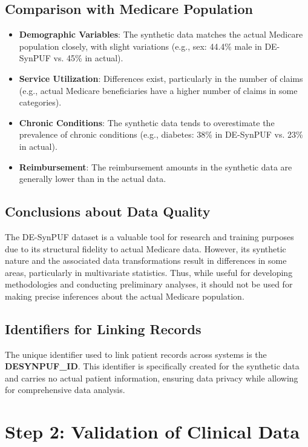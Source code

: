 \documentclass{article}
\begin{document}
\subsection*{Comparison with Medicare Population}

\begin{itemize}
    \item \textbf{Demographic Variables}: The synthetic data matches the actual Medicare population closely, with slight variations (e.g., sex: 44.4\% male in DE-SynPUF vs. 45\% in actual).
    \item \textbf{Service Utilization}: Differences exist, particularly in the number of claims (e.g., actual Medicare beneficiaries have a higher number of claims in some categories).
    \item \textbf{Chronic Conditions}: The synthetic data tends to overestimate the prevalence of chronic conditions (e.g., diabetes: 38\% in DE-SynPUF vs. 23\% in actual).
    \item \textbf{Reimbursement}: The reimbursement amounts in the synthetic data are generally lower than in the actual data.
\end{itemize}

\subsection*{Conclusions about Data Quality}

The DE-SynPUF dataset is a valuable tool for research and training purposes due to its structural fidelity to actual Medicare data. However, its synthetic nature and the associated data transformations result in differences in some areas, particularly in multivariate statistics. Thus, while useful for developing methodologies and conducting preliminary analyses, it should not be used for making precise inferences about the actual Medicare population.

\subsection*{Identifiers for Linking Records}

The unique identifier used to link patient records across systems is the \textbf{DESYNPUF\_ID}. This identifier is specifically created for the synthetic data and carries no actual patient information, ensuring data privacy while allowing for comprehensive data analysis.

\section*{Step 2: Validation of Clinical Data}
\end{document}
